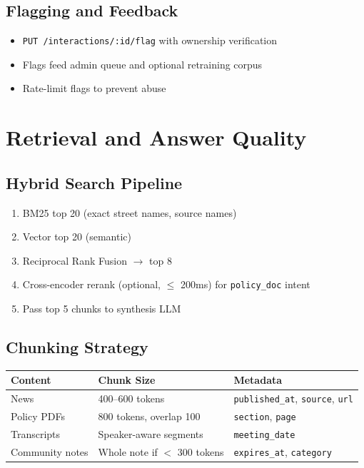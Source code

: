 \documentclass[11pt,a4paper]{article}
\begin{document}
\subsection{Flagging and Feedback}
\begin{itemize}[noitemsep]
  \item \texttt{PUT /interactions/:id/flag} with ownership verification
  \item Flags feed admin queue and optional retraining corpus
  \item Rate-limit flags to prevent abuse
\end{itemize}

\section{Retrieval and Answer Quality}

\subsection{Hybrid Search Pipeline}
\begin{enumerate}[noitemsep]
  \item BM25 top 20 (exact street names, source names)
  \item Vector top 20 (semantic)
  \item Reciprocal Rank Fusion $\rightarrow$ top 8
  \item Cross-encoder rerank (optional, $\leq$ 200ms) for \texttt{policy\_doc} intent
  \item Pass top 5 chunks to synthesis LLM
\end{enumerate}

\subsection{Chunking Strategy}
\begin{table}[h]
\centering
\small
\begin{tabular}{@{}lll@{}}
\toprule
\textbf{Content} & \textbf{Chunk Size} & \textbf{Metadata} \\
\midrule
News & 400--600 tokens & \texttt{published\_at}, \texttt{source}, \texttt{url} \\
Policy PDFs & 800 tokens, overlap 100 & \texttt{section}, \texttt{page} \\
Transcripts & Speaker-aware segments & \texttt{meeting\_date} \\
Community notes & Whole note if $<$ 300 tokens & \texttt{expires\_at}, \texttt{category} \\
\bottomrule
\end{tabular}
\end{table}
\end{document}
